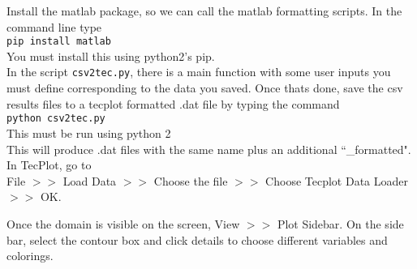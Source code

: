 \documentclass[11pt]{article} %
\newcommand{\code}[1]{\colorbox{light-gray}{\texttt{#1}}}
\begin{document}
\noindent Install the matlab package, so we can call the matlab formatting scripts. In the command line type \\
\indent \code{pip install matlab} \\
\noindent You must install this using python2's pip. \\

\noindent In the script \code{csv2tec.py}, there is a main function with some user inputs you must define corresponding to the data you saved. Once thats done, save the csv results files to a tecplot formatted .dat file by typing the command\\
\indent \code{python csv2tec.py}\\
\noindent This must be run using python 2\\

This will produce .dat files with the same name plus an additional ``\_formatted". In TecPlot, go to \\
 File $>>$ Load Data $>>$ Choose the file $>>$ Choose Tecplot Data Loader $>>$ OK.

Once the domain is visible on the screen, View $>>$ Plot Sidebar. On the side bar, select the contour box and click details to choose different variables and colorings. 
\end{document}

